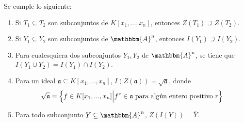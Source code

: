 \documentclass[12pt]{report}
\newcounter{it}
\theoremstyle{largebreak}
\newcommand{\bbm}[1]{\ensuremath{\mathbbm{#1}}}
\newcommand{\fk}[1]{\ensuremath{\mathfrak{#1}}}
\begin{document}
    \begin{propo}
        Se cumple lo siguiente:
        \begin{enumerate}[label=(\textit{\alph*})]
            \item Si $T_1\subseteq T_2$ son subconjuntos de $K[x_1,...,x_n]$, entonces $Z(T_1)\supseteq Z(T_2)$.
            \item Si $Y_1\subseteq Y_2$ son subconjuntos de $\bbm{A}^n$, entonces $I(Y_1)\supseteq I(Y_2)$.
            \item Para cualesquiera dos subconjuntos $Y_1,Y_2$ de $\bbm{A}^n$, se tiene que $I(Y_1\cup Y_2)=I(Y_1)\cap I(Y_2)$.
            \item Para un ideal $\fk{a}\subseteq K[x_1,...,x_n]$, $I(Z(\fk{a}))=\sqrt{\fk{a}}$, donde
            \begin{equation*}
                \sqrt{\fk{a}}=\left\{f\in K[x_1,...,x_n]\Big|f^r\in\fk{a}\textup{ para algún entero positivo }r \right\}
            \end{equation*}
            \item Para todo subconjunto $Y\subseteq\bbm{A}^n$, $Z(I(Y))=\overline{Y}$.
        \end{enumerate}
    \end{propo}
\end{document}
